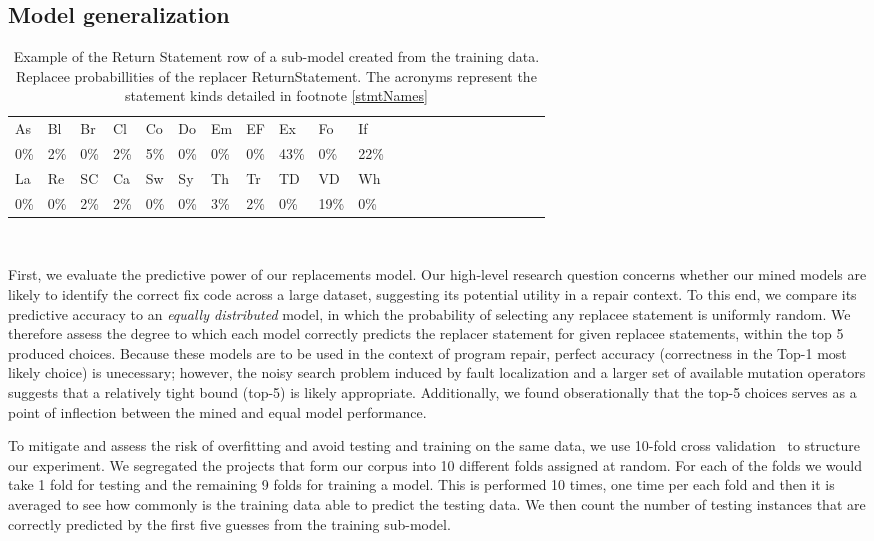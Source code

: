 \documentclass[conference]{IEEEtran}
\begin{document}
\subsection{Model generalization}
\label{sec:generalize}
  

\begin{table}[ht]
\begin{tabular}{llllllllllllllllllllll}
\hline
As & Bl & Br & Cl & Co & Do & Em & EF & Ex & Fo & If \\
0\%&2\%&0\%&2\%&5\%&0\%&0\%&0\%&43\%&0\%&22\% \\
\hline 
La & Re & SC & Ca & Sw & Sy & Th & Tr & TD & VD & Wh \\
0\%&0\%&2\%&2\%&0\%&0\%&3\%&2\%&0\%&19\%&0\% \\
\hline
\end{tabular}
\\
\caption{Example of the Return Statement row of a sub-model created from 
the training data. Replacee probabillities of the replacer ReturnStatement. The acronyms represent the statement kinds detailed in footnote \ref{stmtNames}}
 \label{fig:exPredReturn} 
\end{table} 

First, we evaluate the predictive power of our 
replacements model. Our high-level research question concerns whether 
our mined models are likely to identify the correct fix code across a large
dataset, suggesting its potential utility in a repair context.  To this end, we
compare its predictive accuracy to an \emph{equally distributed} model, in which
the probability of selecting any replacee statement is uniformly random. 
We therefore assess the degree to which each model correctly predicts the
replacer statement for given replacee statements, within the top 5 produced
choices.  Because these models are to be used in the context of program repair,
perfect accuracy (correctness in the Top-1 most likely choice) is unecessary;
however, the noisy search problem induced by fault localization and a larger set
of available mutation operators suggests that a relatively tight bound (top-5)
is likely appropriate.  Additionally, we found obserationally that the top-5
choices serves as a point of inflection between the mined and equal model
performance. 

To mitigate and assess the risk of overfitting and avoid testing and training on
the same data, we use 
10-fold cross validation~\cite{kohavi95} to structure our experiment. 
We segregated the projects that form our corpus into 10 
different folds assigned at random. For each of the 
folds we would take 1 fold for testing and the remaining 9 folds for training a model. 
This is performed 10 times, one time per each fold and then it is 
averaged to see how commonly is the training data able to predict the testing 
data.
We then count the number of testing instances that are correctly predicted 
by the first five guesses from the training sub-model.   
\end{document}
